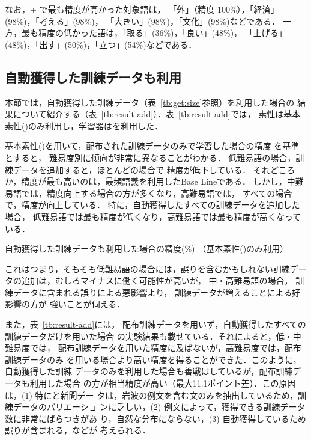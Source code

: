 \documentclass[japanese]{jnlp_1.4}
\newcommand{\bl}{}
\newcommand{\tp}[1]{}
\newcommand{\MEM}{}
\newcommand{\bccwj}{}
\begin{document}
なお，\bl+\tp{200} で最も精度が高かった対象語は，
「外」（精度 100\%），「経済」(98\%)，「考える」(98\%)，
「大きい」(98\%)，「文化」(98\%)などである．
一方，最も精度の低かった語は，「取る」(36\%)，「良い」(48\%)，
「上げる」(48\%)，「出す」(50\%)，「立つ」(54\%)などである．




\subsection{自動獲得した訓練データも利用} 
\label{sec:result-add}


本節では，自動獲得した訓練データ（表~\ref{tb:get:size}参照）を利用した場合の
結果について紹介する（表~\ref{tb:result-add}）．表~\ref{tb:result-add}では，
素性は基本素性(\bl)のみ利用し，学習器は\MEM{}を利用した．

基本素性(\bl)を用いて，配布された訓練データのみで学習した場合の精度
を基準とすると，
難易度別に傾向が非常に異なることがわかる．
低難易語の場合，訓練データを追加すると，ほとんどの場合で
精度が低下している．
それどころか，精度が最も高いのは，最頻語義を利用したBase Lineである．
しかし，中難易語では，精度向上する場合の方が多くなり，高難易語では，
すべての場合で，精度が向上している．
特に，自動獲得したすべての訓練データを追加した場合，
低難易語では最も精度が低くなり，高難易語では最も精度が高くなっている．

\begin{table}[t]
\caption{自動獲得した訓練データも利用した場合の精度(\%) （基本素性(\bl)のみ利用）} 
\label{tb:result-add}

\end{table}

これはつまり，そもそも低難易語の場合には，誤りを含むかもしれない訓練デー
タの追加は，むしろマイナスに働く可能性が高いが，
中・高難易語の場合，
訓練データに含まれる誤りによる悪影響より，
訓練データが増えることによる好影響の方が
強いことが伺える．


また，表~\ref{tb:result-add}には，
配布訓練データを用いず，自動獲得したすべての訓練データだけを用いた場合
の実験結果も載せている．それによると，低・中難易度では，
配布訓練データを用いた精度に及ばないが，高難易度では，配布訓練データのみ
を用いる場合より高い精度を得ることができた．このように，自動獲得した訓練
データのみを利用した場合も善戦はしているが，配布訓練データも利用した場合
の方が相当精度が高い（最大11.1ポイント差）．この原因は，(1) 特に\bccwj と新聞デー
タは，岩波の例文を含む文のみを抽出しているため，訓練データのバリエーショ
ンに乏しい，(2) 例文によって，獲得できる訓練データ数に非常にばらつきがあ
り，自然な分布にならない，(3) 自動獲得しているため誤りが含まれる，などが
考えられる．
\end{document}
